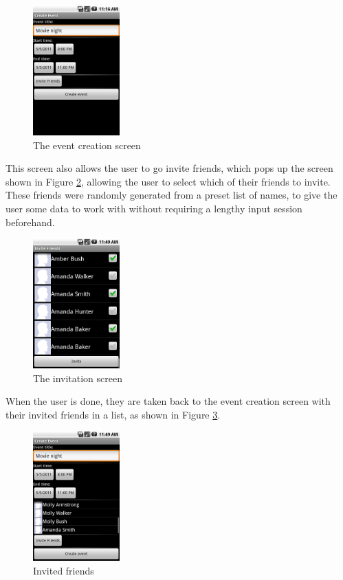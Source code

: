 \documentclass[]{report}
\begin{document}
\begin{figure}[htb]
  \centering
  \includegraphics[height=50mm]{eventcreation}
  \caption{The event creation screen}
  \label{fig:creation}
\end{figure}

This screen also allows the user to go invite friends, which pops up the screen
shown in Figure \ref{fig:invitation}, allowing the user to select which of their friends to
invite. These friends were randomly generated from a preset list of names, to
give the user some data to work with without requiring a lengthy input session
beforehand.

\begin{figure}[htb]
  \centering
  \includegraphics[height=50mm]{invitation}
  \caption{The invitation screen}
  \label{fig:invitation}
\end{figure}

When the user is done, they are taken back to the event creation
screen with their invited friends in a list, as shown in Figure \ref{fig:invited}.

\begin{figure}[htb]
  \centering
  \includegraphics[height=50mm]{invited}
  \caption{Invited friends}
  \label{fig:invited}
\end{figure}
\end{document}
